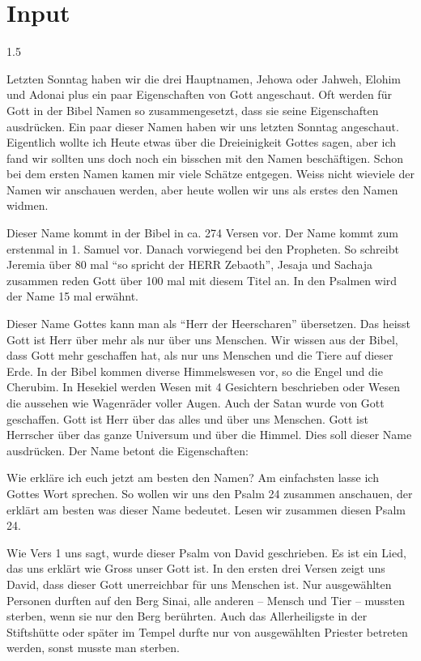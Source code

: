 \documentclass[fontsize=14pt]{../../inc/mybib}
\begin{document}
\section{ Input }
\begin{spacing}{1.5}
    \begin{block}
        Letzten Sonntag haben wir die drei Hauptnamen, Jehowa oder Jahweh, Elohim und Adonai plus ein paar Eigenschaften von Gott angeschaut. Oft werden für Gott in der Bibel Namen so zusammengesetzt, dass sie seine Eigenschaften ausdrücken. Ein paar dieser Namen haben wir uns letzten Sonntag angeschaut. Eigentlich wollte ich Heute etwas über die Dreieinigkeit Gottes sagen, aber ich fand wir sollten uns doch noch ein bisschen mit den Namen beschäftigen. Schon bei dem ersten Namen kamen mir viele Schätze entgegen. Weiss nicht wieviele der Namen wir anschauen werden, aber heute wollen wir uns als erstes den Namen   widmen.

        Dieser Name kommt in der Bibel in ca. 274 Versen vor. Der Name kommt zum erstenmal in 1. Samuel vor. Danach vorwiegend bei den Propheten. So schreibt Jeremia über 80 mal \enquote{so spricht der HERR Zebaoth}, Jesaja und Sachaja zusammen reden Gott über 100 mal mit diesem Titel an. In den Psalmen wird der Name 15 mal erwähnt. 

        Dieser Name Gottes kann man als \enquote{Herr der Heerscharen} übersetzen. Das heisst Gott ist Herr über mehr als nur über uns Menschen. Wir wissen aus der Bibel, dass Gott mehr geschaffen hat, als nur uns Menschen und die Tiere auf dieser Erde. In der Bibel kommen diverse Himmelswesen vor, so \zB{} die Engel und die Cherubim. In Hesekiel werden Wesen mit 4 Gesichtern beschrieben oder Wesen die aussehen wie Wagenräder voller Augen. Auch der Satan wurde von Gott geschaffen. Gott ist Herr über das alles und über uns Menschen. Gott ist Herrscher über das ganze Universum und über die Himmel. Dies soll dieser Name ausdrücken. Der Name betont die Eigenschaften: 
    \end{block}
    \begin{block}
        Wie erkläre ich euch jetzt am besten den Namen? Am einfachsten lasse ich Gottes Wort sprechen.
        So wollen wir uns den Psalm 24 zusammen anschauen, der erklärt am besten  was dieser Name bedeutet. Lesen wir zusammen diesen Psalm 24.
        
        Wie Vers 1 uns sagt, wurde dieser Psalm von David geschrieben. Es ist ein Lied, das uns erklärt wie Gross unser Gott ist. In den ersten drei Versen zeigt uns David, dass dieser Gott unerreichbar für uns Menschen ist. Nur ausgewählten Personen durften auf den Berg Sinai, alle anderen -- Mensch und Tier -- mussten sterben, wenn sie nur den Berg berührten. Auch das Allerheiligste in der Stiftshütte oder später im Tempel durfte nur von ausgewählten Priester betreten werden, sonst musste man sterben. 
        

\end{block}
\end{spacing}
\end{document}
